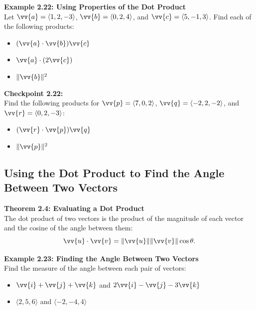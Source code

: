 \documentclass{article}
\begin{document}
\begin{examplebox}
    \textbf{Example 2.22: Using Properties of the Dot Product} \\
    Let \(\vv{a} = \langle 1, 2, -3 \rangle\), \(\vv{b} = \langle 0, 2, 4 \rangle\), and \(\vv{c} = \langle 5, -1, 3 \rangle\). Find each of the following products:
    \begin{itemize}
        \item \((\vv{a} \cdot \vv{b}) \vv{c}\)
        \item \(\vv{a} \cdot (2\vv{c})\)
        \item \(\|\vv{b}\|^2\)
    \end{itemize}
\end{examplebox}

\begin{exercisebox}
    \textbf{Checkpoint 2.22:} \\
    Find the following products for \(\vv{p} = \langle 7, 0, 2 \rangle\), \(\vv{q} = \langle -2, 2, -2 \rangle\), and \(\vv{r} = \langle 0, 2, -3 \rangle\):
    \begin{itemize}
        \item \((\vv{r} \cdot \vv{p}) \vv{q}\)
        \item \(\|\vv{p}\|^2\)
    \end{itemize}
\end{exercisebox}

\subsection*{Using the Dot Product to Find the Angle Between Two Vectors}

\begin{theorembox}
    \textbf{Theorem 2.4: Evaluating a Dot Product} \\
    The dot product of two vectors is the product of the magnitude of each vector and the cosine of the angle between them:
    \[
    \vv{u} \cdot \vv{v} = \|\vv{u}\| \|\vv{v}\| \cos \theta.
    \]
\end{theorembox}

\begin{examplebox}
    \textbf{Example 2.23: Finding the Angle Between Two Vectors} \\
    Find the measure of the angle between each pair of vectors:
    \begin{itemize}
        \item \(\vv{i} + \vv{j} + \vv{k}\) and \(2\vv{i} - \vv{j} - 3\vv{k}\)
        \item \(\langle 2, 5, 6 \rangle\) and \(\langle -2, -4, 4 \rangle\)
    \end{itemize}
\end{examplebox}
\end{document}
